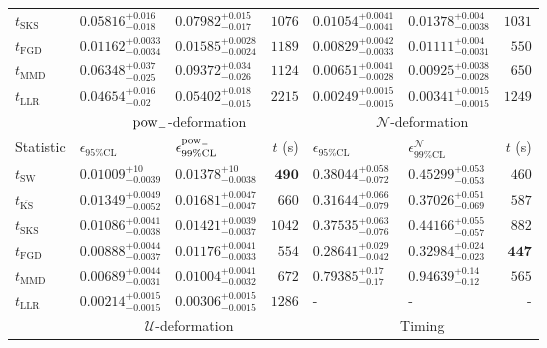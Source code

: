 \begin{tabular}{l|llr|llr}
	$t_{\mathrm{SKS}}$ & $0.05816_{-0.018}^{+0.016}$ & $0.07982_{-0.017}^{+0.015}$ & $1076$ & $0.01054_{-0.0041}^{+0.0041}$ & $0.01378_{-0.0038}^{+0.004}$ & $1031$ \\
	$t_{\mathrm{FGD}}$ & ${\mathbf{0.01162_{-0.0034}^{+0.0033}}}$ & ${\mathbf{0.01585_{-0.0024}^{+0.0028}}}$ & $1189$ & $0.00829_{-0.0033}^{+0.0042}$ & $0.01111_{-0.0031}^{+0.004}$ & $550$ \\
	$t_{\mathrm{MMD}}$ & $0.06348_{-0.025}^{+0.037}$ & $0.09372_{-0.026}^{+0.034}$ & $1124$ & ${\mathbf{0.00651_{-0.0028}^{+0.0041}}}$ & ${\mathbf{0.00925_{-0.0028}^{+0.0038}}}$ & $650$ \\
	$t_{\mathrm{LLR}}$ & $0.04654_{-0.02}^{+0.016}$ & $0.05402_{-0.015}^{+0.018}$ & $2215$ & $0.00249_{-0.0015}^{+0.0015}$ & $0.00341_{-0.0015}^{+0.0015}$ & $1249$ \\
	\toprule
	\multicolumn{1}{c}{} & \multicolumn{3}{c}{$\rm{pow}_{-}$-deformation} & \multicolumn{3}{c}{$\mathcal{N}$-deformation} \\
	Statistic & $\epsilon_{95\%\mathrm{CL}}$ & $\epsilon^  {\rm{pow}_{-}}_{99\%\mathrm{CL}}$ & $t$ (s) & $\epsilon_{95\%\mathrm{CL}}$ & $\epsilon^    {\mathcal{N}}_{99\%\mathrm{CL}}$ & $t$ (s) \\
	\midrule
	$t_{\mathrm{SW}}$ & $0.01009_{-0.0039}^{+10}$ & $0.01378_{-0.0038}^{+10}$ & ${\mathbf{490}}$ & $0.38044_{-0.072}^{+0.058}$ & $0.45299_{-0.053}^{+0.053}$ & $460$ \\
	$t_{\overline{\mathrm{KS}}}$ & $0.01349_{-0.0052}^{+0.0049}$ & $0.01681_{-0.0047}^{+0.0047}$ & $660$ & $0.31644_{-0.079}^{+0.066}$ & $0.37026_{-0.069}^{+0.051}$ & $587$ \\
	$t_{\mathrm{SKS}}$ & $0.01086_{-0.0038}^{+0.0041}$ & $0.01421_{-0.0037}^{+0.0039}$ & $1042$ & $0.37535_{-0.076}^{+0.063}$ & $0.44166_{-0.057}^{+0.055}$ & $882$ \\
	$t_{\mathrm{FGD}}$ & $0.00888_{-0.0037}^{+0.0044}$ & $0.01176_{-0.0033}^{+0.0041}$ & $554$ & ${\mathbf{0.28641_{-0.042}^{+0.029}}}$ & ${\mathbf{0.32984_{-0.023}^{+0.024}}}$ & ${\mathbf{447}}$ \\
	$t_{\mathrm{MMD}}$ & ${\mathbf{0.00689_{-0.0031}^{+0.0044}}}$ & ${\mathbf{0.01004_{-0.0032}^{+0.0041}}}$ & $672$ & $0.79385_{-0.17}^{+0.17}$ & $0.94639_{-0.12}^{+0.14}$ & $565$ \\
	$t_{\mathrm{LLR}}$ & $0.00214_{-0.0015}^{+0.0015}$ & $0.00306_{-0.0015}^{+0.0015}$ & $1286$ & - & - & - \\
	\toprule
	\multicolumn{1}{c}{} & \multicolumn{3}{c}{$\mathcal{U}$-deformation} & \multicolumn{3}{c}{Timing} \\

\end{tabular}
